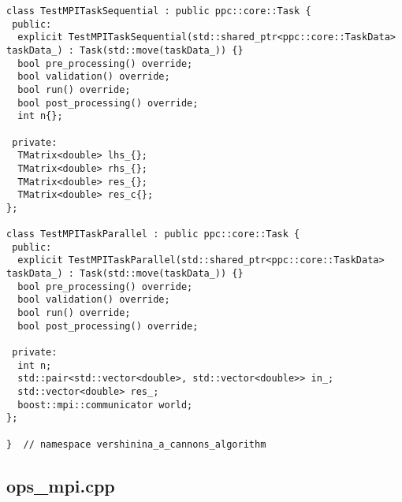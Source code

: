 \documentclass[12pt]{article}
\begin{document}
\begin{lstlisting}
class TestMPITaskSequential : public ppc::core::Task {
 public:
  explicit TestMPITaskSequential(std::shared_ptr<ppc::core::TaskData> taskData_) : Task(std::move(taskData_)) {}
  bool pre_processing() override;
  bool validation() override;
  bool run() override;
  bool post_processing() override;
  int n{};

 private:
  TMatrix<double> lhs_{};
  TMatrix<double> rhs_{};
  TMatrix<double> res_{};
  TMatrix<double> res_c{};
};

class TestMPITaskParallel : public ppc::core::Task {
 public:
  explicit TestMPITaskParallel(std::shared_ptr<ppc::core::TaskData> taskData_) : Task(std::move(taskData_)) {}
  bool pre_processing() override;
  bool validation() override;
  bool run() override;
  bool post_processing() override;

 private:
  int n;
  std::pair<std::vector<double>, std::vector<double>> in_;
  std::vector<double> res_;
  boost::mpi::communicator world;
};

}  // namespace vershinina_a_cannons_algorithm
\end{lstlisting}


\subsection{ops\_mpi.cpp}
\end{document}
